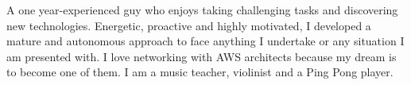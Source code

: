 

\begin{cvparagraph}\justify

A one year-experienced guy who enjoys taking challenging tasks and discovering new technologies. Energetic, proactive and highly motivated, I developed a mature and autonomous approach to face anything I undertake or any situation I am presented with.
I love networking with AWS architects because my dream is to become one of them. I am a music teacher, violinist and a Ping Pong player.
\end{cvparagraph}
